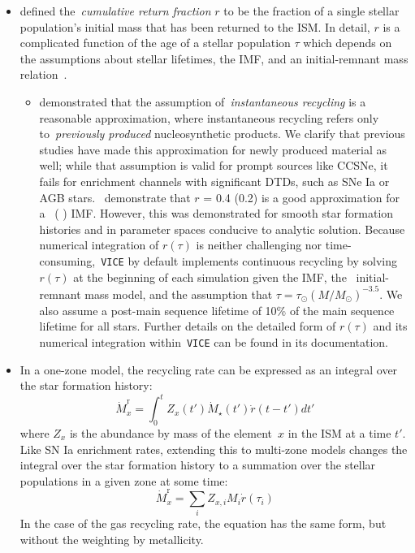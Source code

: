 \documentclass[fleqn, usenatbib]{mnras}
\begin{document}
\begin{itemize} 
	\item \citet{Weinberg2017} defined the~\textit{cumulative return fraction}
	$r$ to be the fraction of a single stellar population's initial mass that 
	has been returned to the ISM. In detail, $r$ is a complicated function of 
	the age of a stellar population $\tau$ which depends on the assumptions 
	about stellar lifetimes, the IMF, and an initial-remnant mass 
	relation~\citep[e.g.][]{Kalirai2008}. 
	\begin{itemize} 
		\item \citet{Weinberg2017} demonstrated that the assumption 
		of~\textit{instantaneous recycling} is a reasonable approximation, 
		where instantaneous recycling refers only to~\textit{previously 
		produced} nucleosynthetic products. We clarify that previous studies 
		have made this approximation for newly produced material as well; 
		while that assumption is valid for prompt sources like CCSNe, it fails 
		for enrichment channels with significant DTDs, such as SNe Ia or 
		AGB stars.~\citet{Weinberg2017} demonstrate that $r$ = 0.4 (0.2) is a 
		good approximation for a~ (
		) IMF. However, this was demonstrated for 
		smooth star formation histories 
		and in parameter spaces conducive to analytic solution. Because 
		numerical integration of $r(\tau)$ is neither challenging nor 
		time-consuming,~\texttt{VICE} by default implements continuous 
		recycling by solving $r(\tau)$ at the beginning of each simulation 
		given the IMF, the~\citet{Kalirai2008} initial-remnant mass model, and 
		the assumption that $\tau = \tau_\odot(M/M_\odot)^{-3.5}$. We also 
		assume a post-main sequence lifetime of 10\% of the main sequence 
		lifetime for all stars. Further details on the detailed form of 
		$r(\tau)$ and its numerical integration within~\texttt{VICE} can be 
		found in its documentation. 
	\end{itemize} 

	\item In a one-zone model, the recycling rate can be expressed as an 
	integral over the star formation history: 
	\begin{equation} 
	\dot{M}_x^\text{r} = \int_0^t Z_x(t') \dot{M}_\star(t') \dot{r}(t - t') dt' 
	\end{equation} 
	where $Z_x$ is the abundance by mass of the element~$x$ in the ISM at a 
	time $t'$. Like SN Ia enrichment rates, extending this to multi-zone models 
	changes the integral over the star formation history to a summation over 
	the stellar populations in a given zone at some time: 
	\begin{equation} 
	\dot{M}_x^\text{r} = \sum_i Z_{x,i} M_i \dot{r}(\tau_i) 
	\end{equation} 
	In the case of the gas recycling rate, the equation has the same form, but 
	without the weighting by metallicity. 


\end{itemize}
\end{document}

